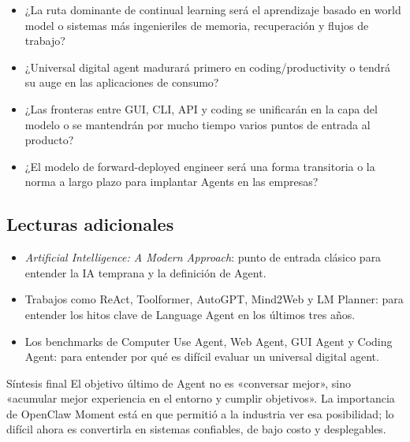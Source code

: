 \documentclass[a4paper]{article}
\begin{document}
\begin{itemize}
\item ¿La ruta dominante de continual learning será el aprendizaje basado en world model o sistemas más ingenieriles de memoria, recuperación y flujos de trabajo?
\item ¿Universal digital agent madurará primero en coding/productivity o tendrá su auge en las aplicaciones de consumo?
\item ¿Las fronteras entre GUI, CLI, API y coding se unificarán en la capa del modelo o se mantendrán por mucho tiempo varios puntos de entrada al producto?
\item ¿El modelo de forward-deployed engineer será una forma transitoria o la norma a largo plazo para implantar Agents en las empresas?
\end{itemize}

\subsection{Lecturas adicionales}

\begin{itemize}
\item \textit{Artificial Intelligence: A Modern Approach}: punto de entrada clásico para entender la IA temprana y la definición de Agent.
\item Trabajos como ReAct, Toolformer, AutoGPT, Mind2Web y LM Planner: para entender los hitos clave de Language Agent en los últimos tres años.
\item Los benchmarks de Computer Use Agent, Web Agent, GUI Agent y Coding Agent: para entender por qué es difícil evaluar un universal digital agent.
\end{itemize}

\begin{importantbox}{Síntesis final}
El objetivo último de Agent no es «conversar mejor», sino «acumular mejor experiencia en el entorno y cumplir objetivos». La importancia de OpenClaw Moment está en que permitió a la industria ver esa posibilidad; lo difícil ahora es convertirla en sistemas confiables, de bajo costo y desplegables.
\end{importantbox}
\end{document}
